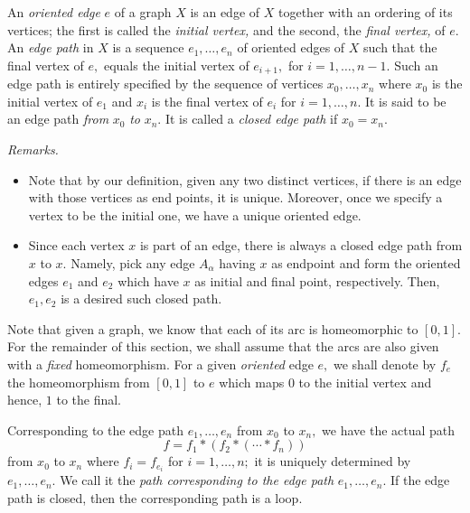 \documentclass[12pt]{article}
\begin{document}
\begin{defn}
	An \emph{oriented edge} $e$ of a graph $X$ is an edge of $X$ together with an ordering of its vertices; the first is called the \emph{initial vertex,} and the second, the \emph{final vertex,} of $e.$ An \emph{edge path} in $X$ is a sequence $e_1, \ldots, e_n$ of oriented edges of $X$ such that the final vertex of $e,$ equals the initial vertex of $e_{i+1},$ for $i = 1,\ldots, n - 1.$ Such an edge path is entirely specified by the sequence of vertices $x_0, \ldots, x_n$ where $x_0$ is the initial vertex of $e_1$ and $x_i$ is the final vertex of $e_i$ for $i = 1,\ldots, n.$ It is said to be an edge path \emph{from} $x_0$ \emph{to} $x_n.$ It is called a \emph{closed edge path} if $x_0 = x_n.$
\end{defn}

\emph{Remarks.}
\begin{itemize}
	\item Note that by our definition, given any two distinct vertices, if there is an edge with those vertices as end points, it is unique. Moreover, once we specify a vertex to be the initial one, we have a unique oriented edge.
	\item Since each vertex $x$ is part of an edge, there is always a closed edge path from $x$ to $x.$ Namely, pick any edge $A_\alpha$ having $x$ as endpoint and form the oriented edges $e_1$ and $e_2$ which have $x$ as initial and final point, respectively. Then, $e_1, e_2$ is a desired such closed path.
\end{itemize}

Note that given a graph, we know that each of its arc is homeomorphic to $[0, 1].$ For the remainder of this section, we shall assume that the arcs are also given with a \emph{fixed} homeomorphism. For a given \emph{oriented} edge $e,$ we shall denote by $f_e$ the homeomorphism from $[0, 1]$ to $e$ which maps $0$ to the initial vertex and hence, $1$ to the final.

\begin{defn}
	Corresponding to the edge path $e_1, \ldots, e_n$ from $x_0$ to $x_n,$ we have the actual path
	\begin{equation*} 
		f = f_1*(f_2*(\cdots*f_n))
	\end{equation*}
	from $x_0$ to $x_n$ where $f_i = f_{e_i}$ for $i = 1, \ldots, n;$ it is uniquely determined by $e_1, \ldots, e_n.$ We call it the \emph{path corresponding to the edge path} $e_1, \ldots, e_n.$ If the edge path is closed, then the corresponding path is a loop.
\end{defn}
\end{document}
